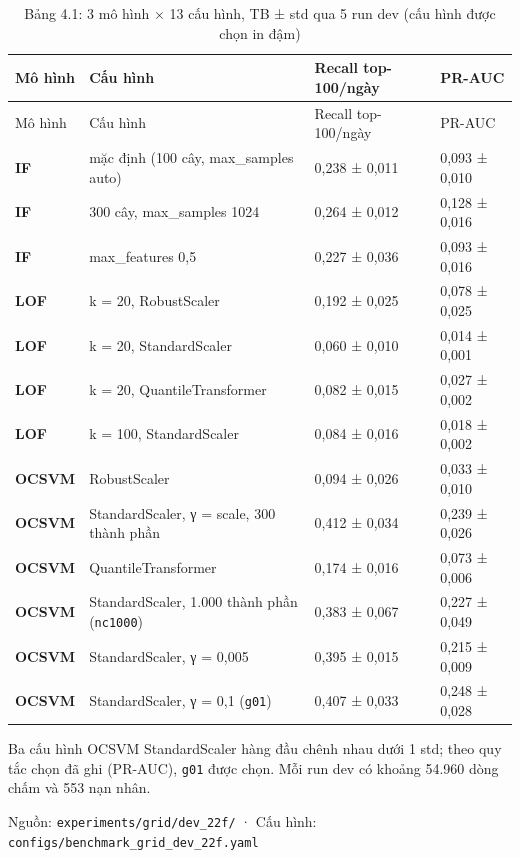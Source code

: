 \documentclass[
  11pt,
]{article}
\begin{document}
\begin{longtable}[]{@{}llll@{}}
\caption{Bảng 4.1: 3 mô hình × 13 cấu hình, TB ± std qua 5 run dev (cấu
hình được chọn in đậm)}\tabularnewline
\toprule\noalign{}
Mô hình & Cấu hình & Recall top-100/ngày & PR-AUC \\
\midrule\noalign{}
\endfirsthead
\toprule\noalign{}
Mô hình & Cấu hình & Recall top-100/ngày & PR-AUC \\
\midrule\noalign{}
\endhead
\bottomrule\noalign{}
\endlastfoot
\textbf{IF} & mặc định (100 cây, max\_\allowbreak{}samples auto) & 0,238
± 0,011 & 0,093 ± 0,010 \\
\textbf{IF} & 300 cây, max\_\allowbreak{}samples 1024 & 0,264 ± 0,012 &
0,128 ± 0,016 \\
\textbf{IF} & max\_\allowbreak{}features 0,5 & 0,227 ± 0,036 & 0,093 ±
0,016 \\
\textbf{LOF} & k = 20, RobustScaler & 0,192 ± 0,025 & 0,078 ± 0,025 \\
\textbf{LOF} & k = 20, StandardScaler & 0,060 ± 0,010 & 0,014 ± 0,001 \\
\textbf{LOF} & k = 20, QuantileTransformer & 0,082 ± 0,015 & 0,027 ±
0,002 \\
\textbf{LOF} & k = 100, StandardScaler & 0,084 ± 0,016 & 0,018 ±
0,002 \\
\textbf{OCSVM} & RobustScaler & 0,094 ± 0,026 & 0,033 ± 0,010 \\
\textbf{OCSVM} & StandardScaler, γ = scale, 300 thành phần & 0,412 ±
0,034 & 0,239 ± 0,026 \\
\textbf{OCSVM} & QuantileTransformer & 0,174 ± 0,016 & 0,073 ± 0,006 \\
\textbf{OCSVM} & StandardScaler, 1.000 thành phần (\texttt{nc1000}) &
0,383 ± 0,067 & 0,227 ± 0,049 \\
\textbf{OCSVM} & StandardScaler, γ = 0,005 & 0,395 ± 0,015 & 0,215 ±
0,009 \\
\textbf{OCSVM} & StandardScaler, γ = 0,1 (\texttt{g01}) & 0,407 ± 0,033
& 0,248 ± 0,028 \\
\end{longtable}

Ba cấu hình OCSVM StandardScaler hàng đầu chênh nhau dưới 1 std; theo
quy tắc chọn đã ghi (PR-AUC), \texttt{g01} được chọn. Mỗi run dev có
khoảng 54.960 dòng chấm và 553 nạn nhân.

Nguồn:
\texttt{experiments/\allowbreak{}grid/\allowbreak{}dev\_\allowbreak{}22f/\allowbreak{}}
· Cấu hình:
\texttt{configs/\allowbreak{}benchmark\_\allowbreak{}grid\_\allowbreak{}dev\_\allowbreak{}22f.\allowbreak{}yaml}
\end{document}
